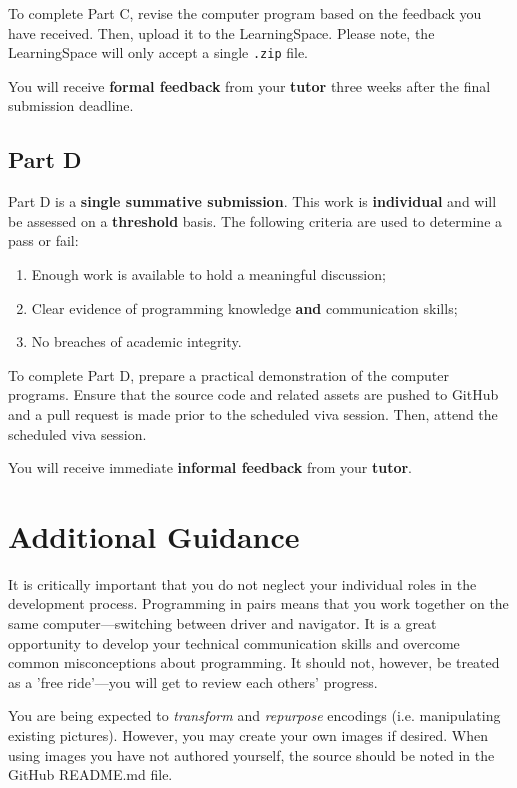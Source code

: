 \documentclass{../fal_assignment}
\begin{document}
To complete Part C, revise the computer program based on the feedback you have received. Then, upload it to the LearningSpace. Please note, the LearningSpace will only accept a single \texttt{.zip} file.

You will receive \textbf{formal feedback} from your \textbf{tutor} three weeks after the final submission deadline.

\subsection*{Part D}

Part D is a \textbf{single summative submission}. This work is \textbf{individual} and will be assessed on a \textbf{threshold} basis.  The following criteria are used to determine a pass or fail:

\begin{enumerate}[label=(\alph*)]
	\item Enough work is available to hold a meaningful discussion;
	\item Clear evidence of programming knowledge \textbf{and} communication skills;
	\item No breaches of academic integrity.
\end{enumerate}

To complete Part D, prepare a practical demonstration of the computer programs. Ensure that the source code and related assets are pushed to GitHub and a pull request is made prior to the scheduled viva session. Then, attend the scheduled viva session.

You will receive immediate \textbf{informal feedback} from your \textbf{tutor}.

\section*{Additional Guidance}

It is critically important that you do not neglect your individual roles in the development process. Programming in pairs means that you work together on the same computer---switching between driver and navigator. It is a great opportunity to develop your technical communication skills and overcome common misconceptions about programming. It should not, however, be treated as a 'free ride'---you will get to review each others' progress. 

You are being expected to \textit{transform} and \textit{repurpose} encodings (i.e. manipulating existing pictures). However, you may create your own images if desired. When using images you have not authored yourself, the source should be noted in the GitHub README.md file. 
\end{document}
